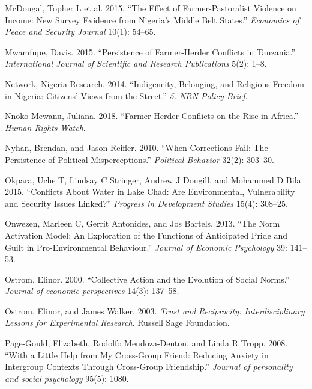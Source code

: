 \documentclass[11pt]{article}
\begin{document}
\leavevmode\hypertarget{ref-mcdougal2015effect}{}%
McDougal, Topher L et al. 2015. ``The Effect of Farmer-Pastoralist
Violence on Income: New Survey Evidence from Nigeria's Middle Belt
States.'' \emph{Economics of Peace and Security Journal} 10(1): 54--65.

\leavevmode\hypertarget{ref-mwamfupe2015persistence}{}%
Mwamfupe, Davis. 2015. ``Persistence of Farmer-Herder Conflicts in
Tanzania.'' \emph{International Journal of Scientific and Research
Publications} 5(2): 1--8.

\leavevmode\hypertarget{ref-nigeria2014freedom}{}%
Network, Nigeria Research. 2014. ``Indigeneity, Belonging, and Religious
Freedom in Nigeria: Citizens' Views from the Street.'' \emph{5. NRN
Policy Brief}.

\leavevmode\hypertarget{ref-hrc2018farmer}{}%
Nnoko-Mewanu, Juliana. 2018. ``Farmer-Herder Conflicts on the Rise in
Africa.'' \emph{Human Rights Watch}.

\leavevmode\hypertarget{ref-nyhan2010corrections}{}%
Nyhan, Brendan, and Jason Reifler. 2010. ``When Corrections Fail: The
Persistence of Political Misperceptions.'' \emph{Political Behavior}
32(2): 303--30.

\leavevmode\hypertarget{ref-okpara2015conflicts}{}%
Okpara, Uche T, Lindsay C Stringer, Andrew J Dougill, and Mohammed D
Bila. 2015. ``Conflicts About Water in Lake Chad: Are Environmental,
Vulnerability and Security Issues Linked?'' \emph{Progress in
Development Studies} 15(4): 308--25.

\leavevmode\hypertarget{ref-onwezen2013norm}{}%
Onwezen, Marleen C, Gerrit Antonides, and Jos Bartels. 2013. ``The Norm
Activation Model: An Exploration of the Functions of Anticipated Pride
and Guilt in Pro-Environmental Behaviour.'' \emph{Journal of Economic
Psychology} 39: 141--53.

\leavevmode\hypertarget{ref-ostrom2000collective}{}%
Ostrom, Elinor. 2000. ``Collective Action and the Evolution of Social
Norms.'' \emph{Journal of economic perspectives} 14(3): 137--58.

\leavevmode\hypertarget{ref-ostrom2003trust}{}%
Ostrom, Elinor, and James Walker. 2003. \emph{Trust and Reciprocity:
Interdisciplinary Lessons for Experimental Research}. Russell Sage
Foundation.

\leavevmode\hypertarget{ref-page2008little}{}%
Page-Gould, Elizabeth, Rodolfo Mendoza-Denton, and Linda R Tropp. 2008.
``With a Little Help from My Cross-Group Friend: Reducing Anxiety in
Intergroup Contexts Through Cross-Group Friendship.'' \emph{Journal of
personality and social psychology} 95(5): 1080.
\end{document}
